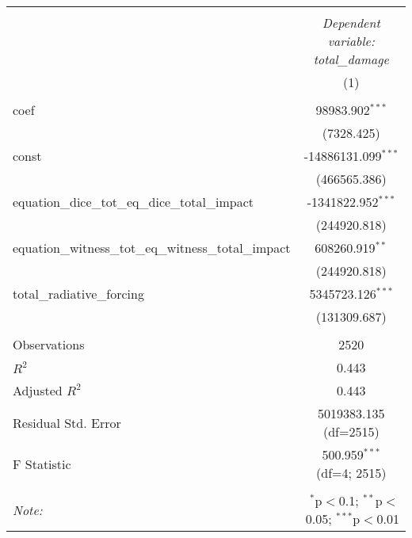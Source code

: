 \begin{table}[!htbp] \centering
\begin{tabular}{@{\extracolsep{5pt}}lc}
\\[-1.8ex]\hline
\hline \\[-1.8ex]
& \multicolumn{1}{c}{\textit{Dependent variable: total_damage}} \
\cr \cline{2-2}
\\[-1.8ex] & (1) \\
\hline \\[-1.8ex]
 coef & 98983.902$^{***}$ \\
& (7328.425) \\
 const & -14886131.099$^{***}$ \\
& (466565.386) \\
 equation_dice_tot_eq_dice_total_impact & -1341822.952$^{***}$ \\
& (244920.818) \\
 equation_witness_tot_eq_witness_total_impact & 608260.919$^{**}$ \\
& (244920.818) \\
 total_radiative_forcing & 5345723.126$^{***}$ \\
& (131309.687) \\
\hline \\[-1.8ex]
 Observations & 2520 \\
 $R^2$ & 0.443 \\
 Adjusted $R^2$ & 0.443 \\
 Residual Std. Error & 5019383.135 (df=2515) \\
 F Statistic & 500.959$^{***}$ (df=4; 2515) \\
\hline
\hline \\[-1.8ex]
\textit{Note:} & \multicolumn{1}{r}{$^{*}$p$<$0.1; $^{**}$p$<$0.05; $^{***}$p$<$0.01} \\
\end{tabular}
\end{table}